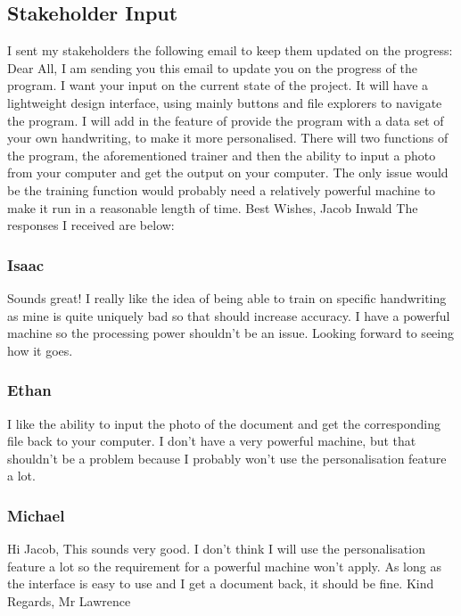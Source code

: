 \documentclass{report}
\begin{document}
\subsection{Stakeholder Input}
I sent my stakeholders the following email to keep them updated on the progress:
\newline
\newline
Dear All,
\newline
I am sending you this email to update you on the progress of the program. I want your input on the current state of the project. 
\newline
It will have a lightweight design interface, using mainly buttons and file explorers to navigate the program. I will add in  the feature of provide the program with a data set of your own handwriting, to make it more personalised. There will two functions of the program, the aforementioned trainer and then the ability to input a photo from your computer and get the output on your computer. The only issue would be the training function would probably need a relatively powerful machine to make it run in a reasonable length of time.
\newline
\newline
Best Wishes,
\newline
Jacob Inwald
\newline
\newline
The responses I received are below:
\subsubsection{Isaac}
Sounds great! I really like the idea of being able to train on specific handwriting as mine is quite uniquely bad so that should increase accuracy. I have a powerful machine so the processing power shouldn't be an issue. Looking forward to seeing how it goes.
\subsubsection{Ethan}
I like the ability to input the photo of the document and get the corresponding file back to your computer. I don't have a very powerful machine, but that shouldn't be a problem because I probably won't use the personalisation feature a lot. 

\subsubsection{Michael}
Hi Jacob,
\newline
\newline
This sounds very good. I don't think I will use the personalisation feature a lot so the requirement for a powerful machine won't apply. As long as the interface is easy to use and I get a document back, it should be fine.
\newline
\newline
Kind Regards,
\newline
Mr Lawrence
\end{document}

